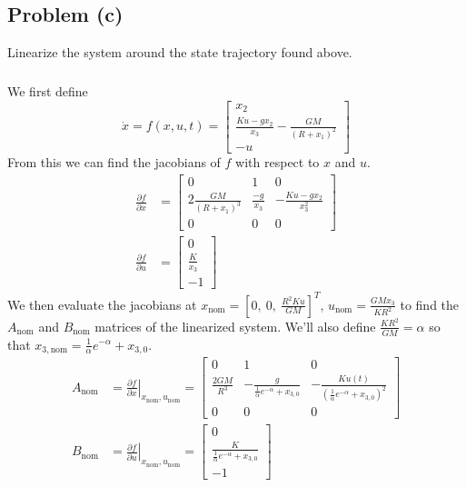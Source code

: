 \documentclass[11pt]{article}
\begin{document}
\subsection*{Problem (c)}
Linearize the system around the state trajectory found above.

\subparagraph*{}
We first define
\begin{equation*}
	\dot{x} = f(x,u,t) = \begin{bmatrix} x_2 \\ \frac{Ku-gx_2}{x_3} - \frac{GM}{(R+x_1)^2} \\ -u \end{bmatrix}
\end{equation*}
From this we can find the jacobians of $f$ with respect to $x$ and $u$.
\begin{align*}
	\frac{\partial f}{\partial x} &= \begin{bmatrix} 0 & 1 & 0 \\ 2\frac{GM}{(R+x_1)^3} & \frac{-g}{x_3} & -\frac{Ku-gx_2}{x_3^2} \\ 0 & 0 & 0 \end{bmatrix} \\
	\frac{\partial f}{\partial u} &= \begin{bmatrix} 0 \\ \frac{K}{x_3} \\ -1 \end{bmatrix}
\end{align*}
We then evaluate the jacobians at $x_{\text{nom}} = [0,\ 0,\ \frac{R^2Ku}{GM}]^T$, $u_{\text{nom}}=\frac{GMx_3}{KR^2}$ to find the $A_\text{nom}$ and $B_\text{nom}$ matrices of the linearized system. We'll also define $\frac{KR^2}{GM} = \alpha$ so that $x_{3,\text{nom}} = \frac{1}{\alpha}e^{-\alpha} + x_{3,0}$.
\begin{align*}
	A_\text{nom} &= \left. \frac{\partial f}{\partial x} \right |_{x_{\text{nom}},u_{\text{nom}}} = \begin{bmatrix} 0 & 1 & 0 \\ \frac{2GM}{R^3} & -\frac{g}{\frac{1}{\alpha}e^{-\alpha} + x_{3,0}} & -\frac{Ku(t)}{(\frac{1}{\alpha}e^{-\alpha} + x_{3,0})^2} \\ 0 & 0 & 0 \end{bmatrix} \\
	B_\text{nom} &= \left. \frac{\partial f}{\partial u} \right |_{x_{\text{nom}},u_{\text{nom}}} = \begin{bmatrix} 0 \\ \frac{K}{\frac{1}{\alpha}e^{-\alpha} + x_{3,0}} \\ -1 \end{bmatrix}
\end{align*}
\end{document}
